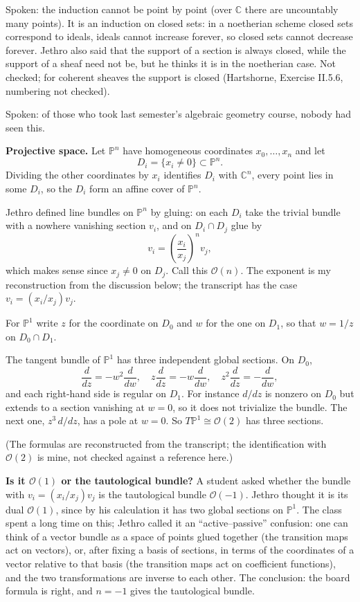 \noindent
Spoken: the induction cannot be point by
point (over $\mathbb{C}$ there are
uncountably many points). It is an
induction on closed sets: in a noetherian
scheme closed sets correspond to ideals,
ideals cannot increase forever, so closed
sets cannot decrease forever. Jethro also
said that the support of a section is always
closed, while the support of a sheaf need
not be, but he thinks it is in the
noetherian case. Not checked; for coherent
sheaves the support is closed (Hartshorne,
Exercise II.5.6, numbering not checked).

Spoken: of those who took last semester's
algebraic geometry course, nobody had seen
this.

\medskip\noindent
{\bf Projective space.} Let
$\mathbb{P}^n$ have homogeneous coordinates
$x_0,\ldots,x_n$ and let
$$
D_i=\{x_i\neq 0\}\subset\mathbb{P}^n.
$$
Dividing the other coordinates by $x_i$
identifies $D_i$ with $\mathbb{C}^n$, every
point lies in some $D_i$, so the $D_i$ form
an affine cover of $\mathbb{P}^n$.

Jethro defined line bundles on
$\mathbb{P}^n$ by gluing: on each $D_i$ take
the trivial bundle with a nowhere vanishing
section $v_i$, and on $D_i\cap D_j$ glue by
$$
v_i=\left(\frac{x_i}{x_j}\right)^nv_j,
$$
which makes sense since $x_j\neq 0$ on
$D_j$. Call this $\mathcal{O}(n)$. The
exponent is my reconstruction from the
discussion below; the transcript has the
case $v_i=(x_i/x_j)v_j$.

For $\mathbb{P}^1$ write $z$ for the
coordinate on $D_0$ and $w$ for the one on
$D_1$, so that $w=1/z$ on $D_0\cap D_1$.

\begin{example}
\label{example-jethro-2026-11-11-tangent-p1}
The tangent bundle of $\mathbb{P}^1$ has
three independent global sections. On $D_0$,
$$
\frac{d}{dz}=-w^2\frac{d}{dw},\quad
z\frac{d}{dz}=-w\frac{d}{dw},\quad
z^2\frac{d}{dz}=-\frac{d}{dw},
$$
and each right-hand side is regular on
$D_1$. For instance $d/dz$ is nonzero on
$D_0$ but extends to a section vanishing at
$w=0$, so it does not trivialize the
bundle. The next one, $z^3\,d/dz$, has a
pole at $w=0$. So
$T\mathbb{P}^1\cong\mathcal{O}(2)$ has three
sections.
\end{example}

\noindent
(The formulas are reconstructed from the
transcript; the identification with
$\mathcal{O}(2)$ is mine, not checked
against a reference here.)

\medskip\noindent
{\bf Is it $\mathcal{O}(1)$ or the
tautological bundle?} A student asked
whether the bundle with $v_i=(x_i/x_j)v_j$
is the tautological bundle $\mathcal{O}(-1)$.
Jethro thought it is its dual
$\mathcal{O}(1)$, since by his calculation
it has two global sections on
$\mathbb{P}^1$. The class spent a long time
on this; Jethro called it an
``active--passive'' confusion: one can think
of a vector bundle as a space of points
glued together (the transition maps act on
vectors), or, after fixing a basis of
sections, in terms of the coordinates of a
vector relative to that basis (the
transition maps act on coefficient
functions), and the two transformations are
inverse to each other. The conclusion: the
board formula is right, and $n=-1$ gives the
tautological bundle.

